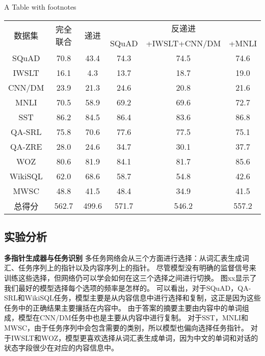 \begin{table}[!htpb]
    {A Table with footnotes}
  \label{tab:drwwlzbtxlclxdsyjg}
  \centering
  \begin{threeparttable}[b]
     \begin{tabular}{cccccc}
      \toprule
      \multirow{2}{18mm}{数据集}&\multirow{2}{18mm}{完全联合}&\multirow{2}{18mm}{递进} & \multicolumn{3}{c}{反递进}\\
      \cmidrule(lr){4-6}
      & & & SQuAD & +IWSLT+CNN/DM & +MNLI\\
      \midrule
      SQuAD & 70.8 & 43.4 & 74.3 & 74.5 & 74.6\\
      IWSLT & 16.1 & 4.3 & 13.7 & 18.7 & 19.0\\
      CNN/DM & 23.9 & 21.3 & 24.6 & 20.8 & 21.6\\
      MNLI & 70.5 & 58.9 & 69.2 & 69.6 & 72.7\\
      SST & 86.2 & 84.5 & 86.4 & 83.6 & 86.8\\
      QA-SRL & 75.8 & 70.6 & 77.6 & 77.5 & 75.1\\
      QA-ZRE & 28.0 & 24.6 & 34.7 & 30.1 & 37.7\\
      WOZ & 80.6 & 81.9 & 84.1 & 81.7 & 85.6\\
      WikiSQL & 62.0 & 68.6 & 58.7 & 54.8 & 42.6\\
      MWSC & 48.8 & 41.5 & 48.4 & 34.9 & 41.5\\
      \midrule
      总得分 & 562.7 & 499.6 & 571.7 & 546.2 & 557.2\\
      \bottomrule
    \end{tabular}
  \end{threeparttable}
\end{table}

\subsection{实验分析}

\textbf{多指针生成器与任务识别}
多任务网络会从三个方面进行选择：从词汇表生成词汇、任务序列上的指针以及内容序列上的指针。
尽管模型没有明确的监督信号来训练这些选择，但网络仍可以学会如何在这三个选择之间进行切换。
图xx显示了我们最好的模型选择每个选项的频率是怎样的。
可以看出，对于SQuAD，QA-SRL和WikiSQL任务，模型主要是从内容信息中进行选择和复制，这正是因为这些任务中的正确结果主要攘括在内容中。
由于答案的摘要主要由内容中的单词组成，模型在CNN/DM任务中也是主要从内容中进行复制。
对于SST，MNLI和MWSC，由于任务序列中会包含需要的类别，所以模型也偏向选择任务指针。
对于IWSLT和WOZ，模型更喜欢选择从词汇表生成单词，因为中文的单词和对话的状态字段很少在对应的内容信息中。

